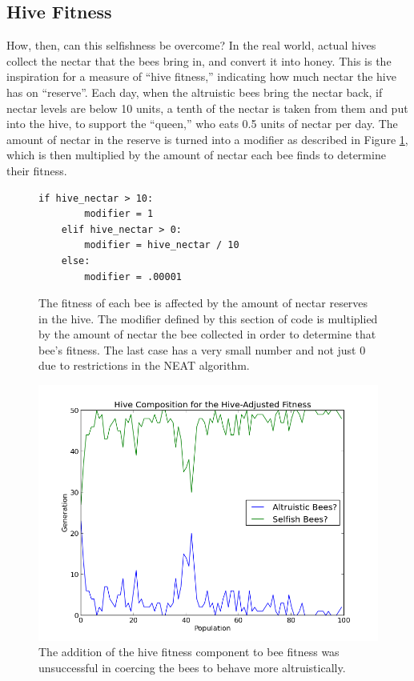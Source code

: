\documentclass[twoside]{article}
\begin{document}
\begin{multicols}{2}
		\subsection{Hive Fitness} %
		\label{sub:hive_fitness}
				How, then, can this selfishness be overcome? In the real world, actual hives collect the	 nectar that the bees bring in, and convert it into honey. This is the inspiration for a measure of ``hive fitness,'' indicating how much nectar the hive has on ``reserve''. Each day, when the altruistic bees bring the nectar back, if nectar levels are below 10 units, a tenth of the nectar is taken from them and put into the hive, to support the ``queen,'' who eats 0.5 units of nectar per day. The amount of nectar in the reserve is turned into a modifier as described in Figure \ref{fig:modifier_algorithm}, which is then multiplied by the amount of nectar each bee finds to determine their fitness.

			\begin{figure}[H]
				\begin{Verbatim}[frame=single]
    if hive_nectar > 10:
        modifier = 1
    elif hive_nectar > 0:
        modifier = hive_nectar / 10
    else:
        modifier = .00001 
				\end{Verbatim}
				\caption{The fitness of each bee is affected by the amount of nectar reserves in the hive. The modifier defined by this section of code is multiplied by the amount of nectar the bee collected in order to determine that bee's fitness. The last case has a very small number and not just 0 due to restrictions in the NEAT algorithm.}
				\label{fig:modifier_algorithm}
			\end{figure}

			\begin{figure}[H]
				\begin{center}
					\includegraphics[width=.5\textwidth]{results/hive_fitness_comp.png}
				\end{center}
				\caption{The addition of the hive fitness component to bee fitness was unsuccessful in coercing the bees to behave more altruistically.}
				\label{fig:hive_fitness_composition}
			\end{figure}


\end{multicols}
\end{document}
